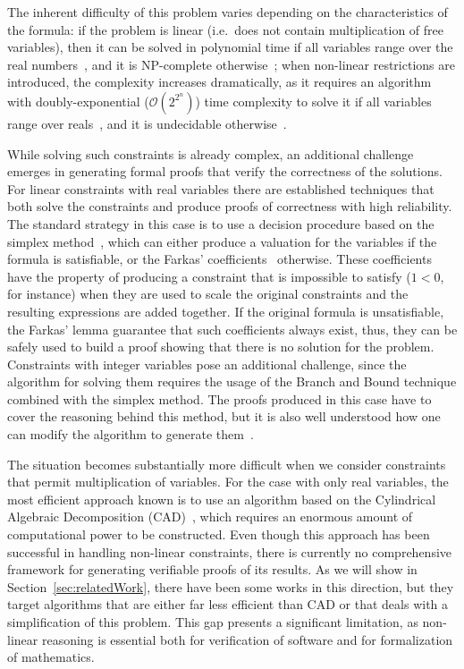 \documentclass[a4paper, 12pt]{article}
\begin{document}
The inherent difficulty of this problem varies depending on the characteristics of the formula:
if the problem is linear (i.e.\ does not contain multiplication of free variables), then
it can be solved in polynomial time if all variables range over the real numbers~\cite{Kha79}, and it
is NP-complete otherwise~\cite{Kar72}; when non-linear restrictions are introduced, the complexity increases
dramatically, as it requires an algorithm with doubly-exponential ($\mathcal{O}(2^{2^{n}})$) time complexity
to solve it if all variables range over reals~\cite{computerAlgebraBook},
and it is undecidable otherwise~\cite{integerUndec}.

While solving such constraints is already complex, an additional challenge emerges in generating
formal proofs that verify the correctness of the solutions.
%
For linear constraints with real variables there are established techniques
that both solve the constraints and produce proofs of correctness with high reliability.
%
The standard strategy in this case is to use a decision procedure based on the simplex method~\cite{simplex_dpllt}, which can either produce a valuation for the variables if the formula
is satisfiable, or the Farkas' coefficients~\cite{farkas_ref} otherwise.
%
These coefficients have the property of producing a constraint that is impossible to satisfy
($1 < 0$, for instance) when they are used to scale the original constraints and the resulting
expressions are added together.
%
If the original formula is unsatisfiable, the Farkas' lemma guarantee that such coefficients always
exist, thus, they can be safely used to build a proof showing that there is no solution for the problem.
%
Constraints with integer variables pose an additional challenge, since the algorithm for solving them
requires the usage of the Branch and Bound technique combined with the simplex method. The proofs produced
in this case have to cover the reasoning behind this method, but it is also well understood how one
can modify the algorithm to generate them~\cite{challengesArithProofs}.

The situation becomes substantially more difficult when we consider constraints that permit
multiplication of variables.
For the case with only real variables, the most efficient approach known is to use an algorithm based on the
Cylindrical Algebraic Decomposition (CAD)~\cite{col75},
which requires an enormous amount of computational power to be constructed. Even though
this approach has been successful in handling non-linear constraints, there is currently
no comprehensive framework for generating verifiable proofs of its results.
%
As we will show in Section~\ref{sec:relatedWork}, there have been some works in this direction, but they
target algorithms that are either far less efficient than CAD or that deals with a simplification of this
problem.
%
This gap presents a significant limitation, as non-linear reasoning is essential both for verification of
software and for formalization of mathematics.
\end{document}
